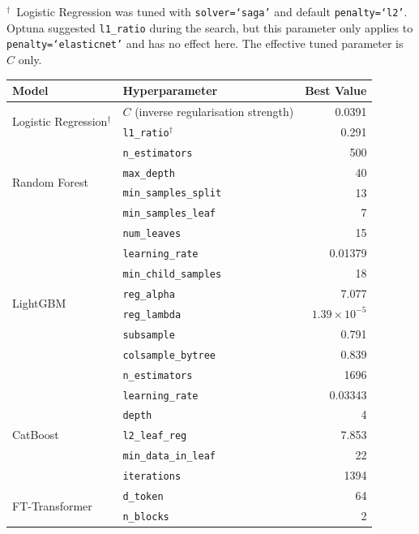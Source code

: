 {\small\noindent $^\dagger$~Logistic Regression was tuned with \texttt{solver=`saga'} and default \texttt{penalty=`l2'}. Optuna suggested \texttt{l1\_ratio} during the search, but this parameter only applies to \texttt{penalty=`elasticnet'} and has no effect here. The effective tuned parameter is $C$ only.}

\par\medskip\noindent\begin{minipage}{\linewidth}\centering
\small
{}
\label{tab:hyperparams_baf}
\begin{tabular}{l l r}
\toprule
Model & Hyperparameter & Best Value \\
\midrule
\multirow{2}{*}{Logistic Regression$^\dagger$}
  & $C$ (inverse regularisation strength) & 0.0391 \\
  & \texttt{l1\_ratio}$^\dagger$ & 0.291 \\
\midrule
\multirow{4}{*}{Random Forest}
  & \texttt{n\_estimators} & 500 \\
  & \texttt{max\_depth} & 40 \\
  & \texttt{min\_samples\_split} & 13 \\
  & \texttt{min\_samples\_leaf} & 7 \\
\midrule
\multirow{8}{*}{LightGBM}
  & \texttt{num\_leaves} & 15 \\
  & \texttt{learning\_rate} & 0.01379 \\
  & \texttt{min\_child\_samples} & 18 \\
  & \texttt{reg\_alpha} & 7.077 \\
  & \texttt{reg\_lambda} & $1.39 \times 10^{-5}$ \\
  & \texttt{subsample} & 0.791 \\
  & \texttt{colsample\_bytree} & 0.839 \\
  & \texttt{n\_estimators} & 1696 \\
\midrule
\multirow{5}{*}{CatBoost}
  & \texttt{learning\_rate} & 0.03343 \\
  & \texttt{depth} & 4 \\
  & \texttt{l2\_leaf\_reg} & 7.853 \\
  & \texttt{min\_data\_in\_leaf} & 22 \\
  & \texttt{iterations} & 1394 \\
\midrule
\multirow{10}{*}{FT-Transformer}
  & \texttt{d\_token} & 64 \\
  & \texttt{n\_blocks} & 2 \\

\end{tabular}
\end{minipage}
